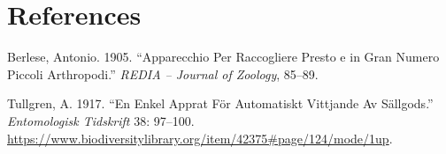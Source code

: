 \documentclass[
]{article}
\newlength{\cslhangindent}
\newlength{\cslentryspacingunit} %
\newenvironment{CSLReferences}[2] %
 {%
  \setlength{\parindent}{0pt}
  \ifodd #1
  \let\oldpar\par
  \def\par{\hangindent=\cslhangindent\oldpar}
  \fi
  \setlength{\parskip}{#2\cslentryspacingunit}
 }%
 {}
\begin{document}
\newpage

\hypertarget{references}{%
\section*{References}\label{references}}

\hypertarget{refs}{}
\begin{CSLReferences}{1}{0}
\leavevmode{}%
Berlese, Antonio. 1905. {``Apparecchio Per Raccogliere Presto e in Gran Numero Piccoli Arthropodi.''} \emph{REDIA -- Journal of Zoology}, 85--89.

\leavevmode{}%
Tullgren, A. 1917. {``En Enkel Apprat För Automatiskt Vittjande Av Sällgods.''} \emph{Entomologisk Tidskrift} 38: 97--100. \url{https://www.biodiversitylibrary.org/item/42375\#page/124/mode/1up}.

\end{CSLReferences}

\let\cleardoublepage\clearpage
\end{document}
